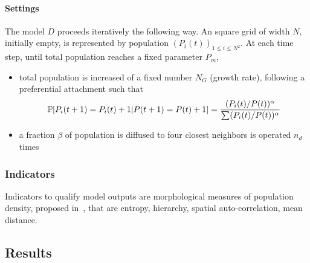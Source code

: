 \paragraph{Settings}


The model $D$ proceeds iteratively the following way. An square grid of width $N$, initially empty, is represented by population $(P_i(t))_{1\leq i\leq N^2}$. At each time step, until total population reaches a fixed parameter $P_m$,
\begin{itemize}
\item total population is increased of a fixed number $N_G$ (growth rate), following a preferential attachment such that 
\[\operatorname{\mathbb{P}}\!\left[P_i(t+1)=P_i(t)+1|P(t+1)=P(t)+1\right]=\frac{(P_i(t)/P(t))^{\alpha}}{\sum(P_i(t)/P(t))^{\alpha}}\]
\item a fraction $\beta$ of population is diffused to four closest neighbors is operated $n_d$ times
\end{itemize}







\subsubsection{Indicators}



Indicators to qualify model outputs are morphological measures of population density, proposed in~\cite{le2015forme}, that are entropy, hierarchy, spatial auto-correlation, mean distance. 



\subsection{Results}



